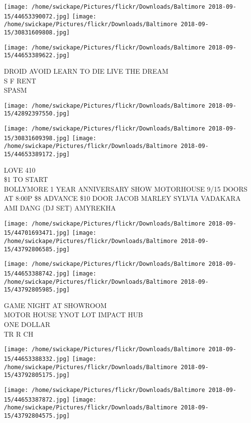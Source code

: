 \documentclass[10pt,letterpaper]{article}
\begin{document}
\texttt{[image: /home/swickape/Pictures/flickr/Downloads/Baltimore 2018-09-15/44653390072.jpg]}
\texttt{[image: /home/swickape/Pictures/flickr/Downloads/Baltimore 2018-09-15/30831609808.jpg]}

\texttt{[image: /home/swickape/Pictures/flickr/Downloads/Baltimore 2018-09-15/44653389622.jpg]}

DROID AVOID LEARN TO DIE LIVE THE DREAM\\
S F RENT\\
SPASM\\
\pagebreak

\texttt{[image: /home/swickape/Pictures/flickr/Downloads/Baltimore 2018-09-15/42892397550.jpg]}

\vspace{0.25in}
\texttt{[image: /home/swickape/Pictures/flickr/Downloads/Baltimore 2018-09-15/30831609398.jpg]}
\texttt{[image: /home/swickape/Pictures/flickr/Downloads/Baltimore 2018-09-15/44653389172.jpg]}

LOVE 410\\
\$1 TO START\\
BOLLYMORE 1 YEAR ANNIVERSARY SHOW MOTORHOUSE 9/15 DOORS AT 8:00P \$8 ADVANCE \$10 DOOR JACOB MARLEY SYLVIA VADAKARA AMI DANG (DJ SET) AMYREKHA\\
\pagebreak

\texttt{[image: /home/swickape/Pictures/flickr/Downloads/Baltimore 2018-09-15/44701693471.jpg]}
\texttt{[image: /home/swickape/Pictures/flickr/Downloads/Baltimore 2018-09-15/43792806585.jpg]}

\texttt{[image: /home/swickape/Pictures/flickr/Downloads/Baltimore 2018-09-15/44653388742.jpg]}
\texttt{[image: /home/swickape/Pictures/flickr/Downloads/Baltimore 2018-09-15/43792805985.jpg]}

GAME NIGHT AT SHOWROOM\\
MOTOR HOUSE YNOT LOT IMPACT HUB\\
ONE DOLLAR\\
TR R CH\\
\pagebreak

\texttt{[image: /home/swickape/Pictures/flickr/Downloads/Baltimore 2018-09-15/44653388332.jpg]}
\texttt{[image: /home/swickape/Pictures/flickr/Downloads/Baltimore 2018-09-15/43792805175.jpg]}

\texttt{[image: /home/swickape/Pictures/flickr/Downloads/Baltimore 2018-09-15/44653387872.jpg]}
\texttt{[image: /home/swickape/Pictures/flickr/Downloads/Baltimore 2018-09-15/43792804575.jpg]}
\end{document}
